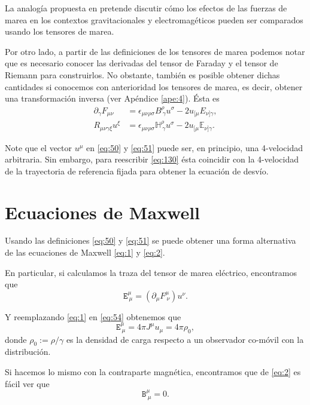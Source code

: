 La analogía propuesta en \cite{Costa-Herdeiro} pretende discutir cómo los efectos de las fuerzas de marea en los contextos gravitacionales y electromagéticos pueden ser comparados usando los tensores de marea.

Por otro lado, a partir de las definiciones de los tensores de marea podemos notar que es necesario conocer las derivadas del tensor de Faraday y el tensor de Riemann para construirlos. No obstante, también es posible obtener dichas cantidades si conocemos con anterioridad los tensores de marea, es decir, obtener una transformación inversa (ver Apéndice \ref{ape:4}). Ésta es
\begin{align}
\label{eq:52}
\partial_{\gamma} F_{\mu \nu} &= \epsilon_{\mu \nu \rho \sigma} \mathit{B}^{\rho}_{\ \gamma} u^{\sigma} - 2u_{[\mu} \mathit{E}_{\nu] \gamma},\\
\label{eq:53}
R_{\mu \nu \gamma \xi} u^{\xi} &= \epsilon_{\mu \nu \rho \sigma} \mathbb{H}^{\rho}_{\ \gamma} u^{\sigma} - 2u_{[\mu} \mathbb{E}_{\nu] \gamma}.
\end{align}

Note que el vector $u^{\mu}$ en \eqref{eq:50} y \eqref{eq:51} puede ser, en principio, una 4-velocidad arbitraria. Sin embargo, para reescribir \eqref{eq:130} ésta coincidir con la 4-velocidad de la trayectoria de referencia fijada para obtener la ecuación de desvío.  

\section{Ecuaciones de Maxwell}

Usando las definiciones \eqref{eq:50} y \eqref{eq:51} se puede obtener una forma alternativa de las ecuaciones de Maxwell \eqref{eq:1} y \eqref{eq:2}.

En particular, si calculamos la traza del tensor de marea eléctrico, encontramos que
\begin{equation}
\label{eq:54}
\mathtt{E}^{\mu}_{\ \mu} = \left( \partial_{\mu} F^{\mu}_{\ \nu} \right) u^{\nu}.
\end{equation}

Y reemplazando \eqref{eq:1} en \eqref{eq:54} obtenemos que
\begin{equation}
\mathtt{E}^{\mu}_{\ \mu} = 4\pi J^{\mu} u_{\mu} = 4\pi \rho_0,
\end{equation}
donde $\rho_0 := \rho / \gamma$ es la densidad de carga respecto a un observador co-móvil con la distribución.

Si hacemos lo mismo con la contraparte magnética, encontramos que de \eqref{eq:2} es fácil ver que
\begin{equation}
\mathtt{B}^{\mu}_{\ \mu} = 0.
\end{equation}

